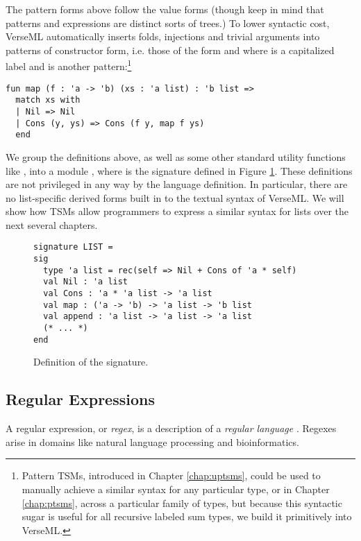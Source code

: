 The pattern forms above follow the value forms (though keep in mind that patterns and expressions are distinct sorts of trees.) To lower syntactic cost, VerseML automatically inserts folds, injections and trivial arguments into patterns of constructor form, i.e. those of the form  and  where  is a capitalized label and  is another pattern:\footnote{Pattern TSMs, introduced in Chapter \ref{chap:uptsms}, could be used to manually achieve a similar syntax for any particular type, or in Chapter \ref{chap:ptsms}, across a particular family of types, but because this syntactic sugar is useful for all recursive labeled sum types, we build it primitively into VerseML.}
\begin{lstlisting}[numbers=none]
fun map (f : 'a -> 'b) (xs : 'a list) : 'b list => 
  match xs with 
  | Nil => Nil 
  | Cons (y, ys) => Cons (f y, map f ys)
  end
\end{lstlisting}

We group the definitions above, as well as some other standard utility functions like , into a module , where  is the signature defined in Figure \ref{fig:LIST}. These definitions are not privileged in any way by the language definition. In particular, there are no list-specific derived forms built in to the textual syntax of VerseML. We will show how TSMs allow programmers to express a similar syntax for lists over the next several chapters.

\begin{figure}
\begin{lstlisting}[numbers=none]
signature LIST = 
sig 
  type 'a list = rec(self => Nil + Cons of 'a * self)
  val Nil : 'a list
  val Cons : 'a * 'a list -> 'a list
  val map : ('a -> 'b) -> 'a list -> 'b list
  val append : 'a list -> 'a list -> 'a list
  (* ... *)
end
\end{lstlisting}
\caption{Definition of the  signature.}
\label{fig:LIST}
\end{figure}

\subsection{Regular Expressions}\label{sec:syntax-examples-regexps}
A regular expression, or \emph{regex}, is a description of a \emph{regular language} \cite{Thompson:1968:PTR:363347.363387}. Regexes arise in domains like natural language processing and bioinformatics.

